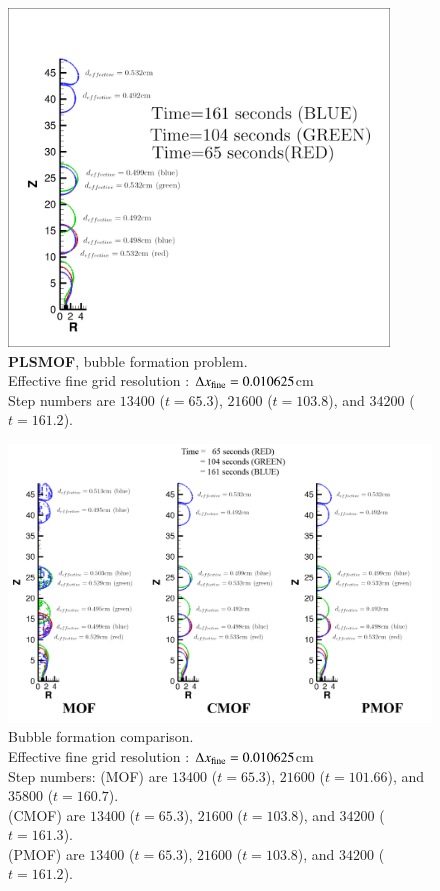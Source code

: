 \documentclass[preprint,12pt]{Definitions/elsarticle}
\newcommand{\tn}{\textnormal}
\begin{document}
\begin{figure}[htbp]
	\centering
	\includegraphics[width=0.9\textwidth]{pmof_bubble_formation_april4.png} 
	\caption{\textbf{PLSMOF}, bubble formation problem.\\
		Effective fine grid resolution : $\Delta x_\tn{fine}=0.010625$cm\\
		Step numbers are $13400$ ($t=65.3$), $21600$ ($t=103.8$), and $34200$ ($t=161.2$). }
	\label{PLSMOF_bubble_formation}
\end{figure}

\begin{figure}[H]
	\centering
	\includegraphics[width=1\textwidth]{PMOFbubbleformation/comparison_bubble_formation_april4.png} 
	\caption{Bubble formation comparison.\\
		Effective fine grid resolution : $\Delta x_\tn{fine}=0.010625$cm\\
		Step numbers: (MOF) are $13400$ ($t=65.3$), $21600$ ($t=101.66$), and $35800$ ($t=160.7$).\\
		\hspace{15em}(CMOF) are $13400$ ($t=65.3$), $21600$ ($t=103.8$), and $34200$ ($t=161.3$).\\
		             (PMOF) are $13400$ ($t=65.3$), $21600$ ($t=103.8$), and $34200$ ($t=161.2$). }
	\label{comparison_bubble_formation}
\end{figure}
\end{document}
